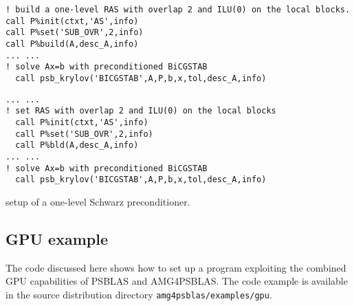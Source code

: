 \begin{listing}[h!]
\ifpdf
\begin{verbatim}
! build a one-level RAS with overlap 2 and ILU(0) on the local blocks.
call P%init(ctxt,'AS',info)
call P%set('SUB_OVR',2,info)
call P%build(A,desc_A,info)
... ...
! solve Ax=b with preconditioned BiCGSTAB
  call psb_krylov('BICGSTAB',A,P,b,x,tol,desc_A,info)
\end{verbatim}
\else
\begin{center}
\begin{minipage}{.90\textwidth}
{\small
\begin{verbatim}
... ...
! set RAS with overlap 2 and ILU(0) on the local blocks
  call P%init(ctxt,'AS',info)
  call P%set('SUB_OVR',2,info)
  call P%bld(A,desc_A,info)
... ...
! solve Ax=b with preconditioned BiCGSTAB
  call psb_krylov('BICGSTAB',A,P,b,x,tol,desc_A,info)
\end{verbatim}
}
\end{minipage}
\end{center}
\fi\vspace{-2em}%
\caption{setup of a one-level Schwarz preconditioner.\label{fig:ex4}}
\end{listing}



\subsection{GPU example\label{sec:gpu-example}}

The code discussed here  shows how to set  up a
program exploiting the combined GPU capabilities of PSBLAS and
AMG4PSBLAS. The code example is available in the source distribution
directory \verb|amg4psblas/examples/gpu|. 

